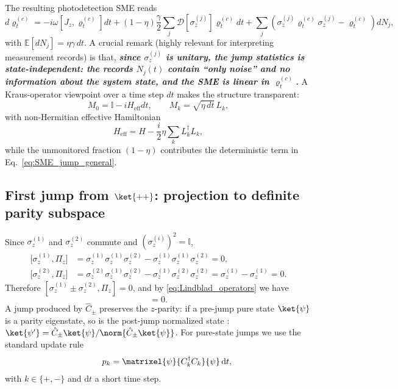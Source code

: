 The resulting photodetection SME reads
\begin{equation}
	d\varrho_t^{(c)}
	=
	-i\omega[J_z,\varrho_t^{(c)}]dt
	+ (1-\eta)\frac{\gamma}{2}\sum_j \mathcal{D}[\sigma_z^{(j)}]\varrho_t^{(c)}dt
	+ \sum_j\left(\sigma_z^{(j)}\varrho_t^{(c)}\sigma_z^{(j)}-\varrho_t^{(c)}\right)dN_j,
	\label{eq:AG_PD_SME}
\end{equation}
with $\mathbb{E}[dN_j]=\eta\gamma\,dt$.
A crucial remark (highly relevant for interpreting measurement records) is that, \textbf{\textit{since
$\sigma_z^{(j)}$ is unitary, the jump statistics is \emph{state-independent}: the records
$N_j(t)$ contain ``only noise'' and no information about the system state, and the SME is
linear in $\varrho_t^{(c)}$.}}
A Kraus-operator viewpoint over a time step $dt$ makes the structure transparent:
\begin{equation}
	M_0 = \mathbb{I} - iH_{\mathrm{eff}}dt,
	\qquad
	M_k = \sqrt{\eta\,dt}\,L_k,
\end{equation}
with non-Hermitian effective Hamiltonian
\begin{equation}
	H_{\mathrm{eff}} = H - \frac{i}{2}\eta\sum_k L_k^\dagger L_k,
\end{equation}
while the unmonitored fraction $(1-\eta)$ contributes the deterministic term in Eq.~\eqref{eq:SME_jump_general}.


\subsection{First jump from \texorpdfstring{$\ket{++}$}{|++>}: projection to definite parity subspace}

Since \(\sigma_z^{(1)}\) and \(\sigma_z^{(2)}\) commute and \((\sigma_z^{(i)})^2=\mathbb{I}\),
\begin{align}
	\big[\sigma_z^{(1)},\Pi_z\big]
	&=\sigma_z^{(1)}\sigma_z^{(1)}\sigma_z^{(2)}-\sigma_z^{(1)}\sigma_z^{(1)}\sigma_z^{(2)}=0,\\
	\big[\sigma_z^{(2)},\Pi_z\big]
	&=\sigma_z^{(2)}\sigma_z^{(1)}\sigma_z^{(2)}-\sigma_z^{(1)}\sigma_z^{(2)}\sigma_z^{(2)}
	=\sigma_z^{(1)}-\sigma_z^{(1)}=0.
\end{align}
Therefore \([\sigma_z^{(1)}\pm \sigma_z^{(2)},\Pi_z]=0\), and by \eqref{eq:Lindblad_operators} we have
\begin{equation}
	[\hat{C}_\pm,\Pi_z]=0.
\end{equation}
A jump produced by \(\hat{C}_\pm\) preserves the $z$-parity: if a pre-jump pure state \(\ket{\psi}\) is a parity eigenstate, so is the post-jump normalized state : 
\(\ket{\psi'}=\hat{C}_\pm\ket{\psi}/\norm{\hat{C}_\pm\ket{\psi}}\).
For pure-state jumps we use the standard update rule
\begin{equation}
	\qquad p_k=\matrixel{\psi}{C_k^\dagger C_k}{\psi}\,\mathrm{d}t,
	\label{eq:jump_rule}
\end{equation}
with \(k\in\{+,-\}\) and \(\mathrm{d}t\) a short time step.

